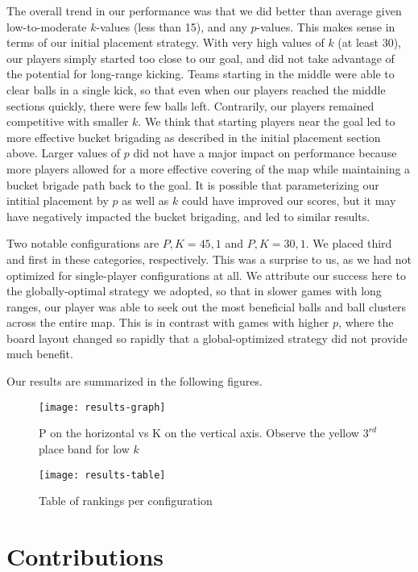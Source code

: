 \documentclass[
10pt, %
letterpaper, %
oneside, %
headinclude,footinclude, %
english
]{article}
\begin{document}
The overall trend in our performance was that we did better than average given low-to-moderate $k$-values (less than 15), and any $p$-values. This makes sense in terms of our initial placement strategy. With very high values of $k$ (at least 30), our players simply started too close to our goal, and did not take advantage of the potential for long-range kicking. Teams starting in the middle were able to clear balls in a single kick, so that even when our players reached the middle sections quickly, there were few balls left. Contrarily, our players remained competitive with smaller $k$. We think that starting players near the goal led to more effective bucket brigading as described in the initial placement section above. Larger values of $p$ did not have a major impact on performance because more players allowed for a more effective covering of the map while maintaining a bucket brigade path back to the goal. It is possible that parameterizing our intitial placement by $p$ as well as $k$ could have improved our scores, but it may have negatively impacted the bucket brigading, and led to similar results.

Two notable configurations are $P,K=45,1$ and $P,K=30,1$. We placed third and first in these categories, respectively. This was a surprise to us, as we had not optimized for single-player configurations at all. We attribute our success here to the globally-optimal strategy we adopted, so that in slower games with long ranges, our player was able to seek out the most beneficial balls and ball clusters across the entire map. This is in contrast with games with higher $p$, where the board layout changed so rapidly that a global-optimized strategy did not provide much benefit.

Our results are summarized in the following figures.

\begin{figure}[h]
\centering
\texttt{[image: results-graph]}
\caption[Group 5 tournament results as a function of P and K]{P on the horizontal vs K on the vertical axis. Observe the yellow $3^{rd}$ place band for low $k$}
\label{fig:gallery2}
\end{figure}

\begin{figure}[h]
\centering
\texttt{[image: results-table]}
\caption[Table of rankings per configuration]{Table of rankings per configuration}
\label{fig:gallery2}
\end{figure}

\section{Contributions}
\end{document}
